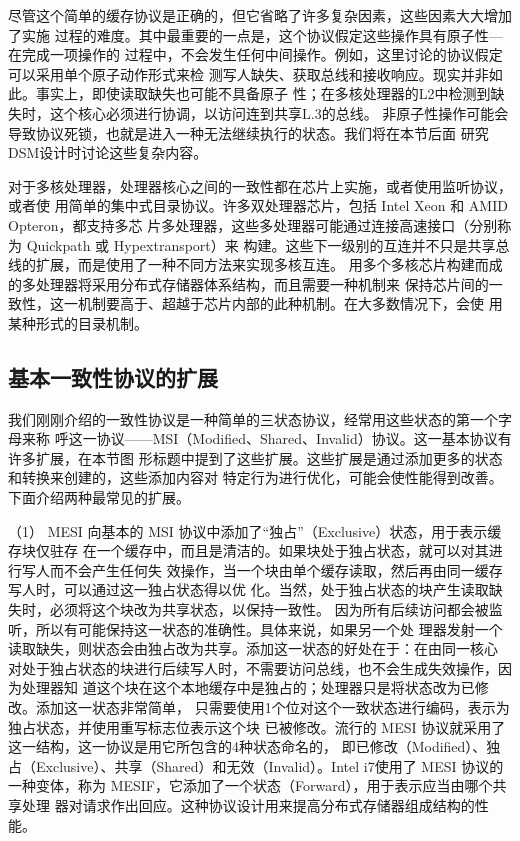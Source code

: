 尽管这个简单的缓存协议是正确的，但它省略了许多复杂因素，这些因素大大增加了实施
过程的难度。其中最重要的一点是，这个协议假定这些操作具有原子性—在完成一项操作的
过程中，不会发生任何中间操作。例如，这里讨论的协议假定可以采用单个原子动作形式来检
测写人缺失、获取总线和接收响应。现实并非如此。事实上，即使读取缺失也可能不具备原子
性；在多核处理器的L2中检测到缺失时，这个核心必须进行协调，以访问连到共享L.3的总线。
非原子性操作可能会导致协议死锁，也就是进入一种无法继续执行的状态。我们将在本节后面
研究 DSM设计时讨论这些复杂内容。

对于多核处理器，处理器核心之间的一致性都在芯片上实施，或者使用监听协议，或者使
用简单的集中式目录协议。许多双处理器芯片，包括 Intel Xeon 和 AMID Opteron，都支持多芯
片多处理器，这些多处理器可能通过连接高速接口（分别称为 Quickpath 或 Hypextransport）来
构建。这些下一级别的互连并不只是共享总线的扩展，而是使用了一种不同方法来实现多核互连。
用多个多核芯片构建而成的多处理器将采用分布式存储器体系结构，而且需要一种机制来
保持芯片间的一致性，这一机制要高于、超越于芯片内部的此种机制。在大多数情况下，会使
用某种形式的目录机制。

\subsection{基本一致性协议的扩展}
我们刚刚介绍的一致性协议是一种简单的三状态协议，经常用这些状态的第一个字母来称
呼这一协议——MSI（Modified、Shared、Invalid）协议。这一基本协议有许多扩展，在本节图
形标题中提到了这些扩展。这些扩展是通过添加更多的状态和转换来创建的，这些添加内容对
特定行为进行优化，可能会使性能得到改善。下面介绍两种最常见的扩展。

（1） MESI 向基本的 MSI 协议中添加了“独占”（Exclusive）状态，用于表示缓存块仅驻存
在一个缓存中，而且是清洁的。如果块处于独占状态，就可以对其进行写人而不会产生任何失
效操作，当一个块由单个缓存读取，然后再由同一缓存写人时，可以通过这一独占状态得以优
化。当然，处于独占状态的块产生读取缺失时，必须将这个块改为共享状态，以保持一致性。
因为所有后续访问都会被监听，所以有可能保持这一状态的准确性。具体来说，如果另一个处
理器发射一个读取缺失，则状态会由独占改为共享。添加这一状态的好处在于：在由同一核心
对处于独占状态的块进行后续写人时，不需要访问总线，也不会生成失效操作，因为处理器知
道这个块在这个本地缓存中是独占的；处理器只是将状态改为已修改。添加这一状态非常简单，
只需要使用1个位对这个一致状态进行编码，表示为独占状态，并使用重写标志位表示这个块
已被修改。流行的 MESI 协议就采用了这一结构，这一协议是用它所包含的4种状态命名的，
即已修改（Modified）、独占（Exclusive）、共享（Shared）和无效（Invalid）。Intel i7使用了 MESI
协议的一种变体，称为 MESIF，它添加了一个状态（Forward），用于表示应当由哪个共享处理
器对请求作出回应。这种协议设计用来提高分布式存储器组成结构的性能。

